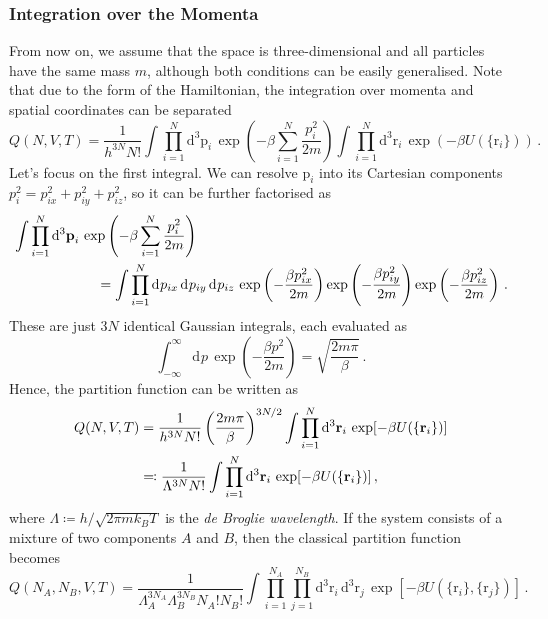 \documentclass{article}
\theoremstyle{plain}\theoremheaderfont{\normalfont\bfseries}\theorembodyfont{\rmfamily}\theoremseparator{.}\newtheorem*{thm}{Theorem}\newtheorem*{law}{Law}\newtheorem*{pos}{Postulate}
\numberwithin{equation}{section}
\newcommand{\dd}[2][]{\mathrm{d}^{#1} #2\,}
\newcommand{\vb}[1]{\bm{\mathrm{#1}}}
\begin{document}
    \subsubsection{Integration over the Momenta}
    From now on, we assume that the space is three-dimensional and all particles have the same mass \(m\), although both conditions can be easily generalised. Note that due to the form of the Hamiltonian, the integration over momenta and spatial coordinates can be separated
    \begin{equation}
        Q(N,V,T)=\frac{1}{h^{3N}N!}\int\prod_{i=1}^{N}\dd[3]{\vb{p}_i}\exp\left(-\beta\sum_{i=1}^{N}\frac{p_i^2}{2m}\right)\int\prod_{i=1}^{N}\dd[3]{\vb{r}_i}\exp(-\beta U(\{\vb{r}_i\}))\,.
    \end{equation}
    Let's focus on the first integral. We can resolve \(\vb{p}_i\) into its Cartesian components \(p_i^2=p_{ix}^2+p_{iy}^2+p_{iz}^2\), so it can be further factorised as
    \begin{align}
        &\int\prod_{i=1}^{N}\dd[3]{\vb{p}_i}\exp\left(-\beta\sum_{i=1}^{N}\frac{p_i^2}{2m}\right)\notag\\
        &\qquad\qquad\qquad= \int\prod_{i=1}^{N}\dd{p_{ix}}\dd{p_{iy}}\dd{p_{iz}}\exp\left(-\frac{\beta p_{ix}^2}{2m}\right)\exp\left(-\frac{\beta p_{iy}^2}{2m}\right)\exp\left(-\frac{\beta p_{iz}^2}{2m}\right)\,.
    \end{align}
    These are just \(3N\) identical Gaussian integrals, each evaluated as
    \begin{equation}
        \int_{-\infty}^{\infty}\dd{p}\exp\left(-\frac{\beta p^2}{2m}\right)=\sqrt{\frac{2m\pi}{\beta}}\,.
    \end{equation}
    Hence, the partition function can be written as
    \begin{align}
        Q(N,V,T)&=\frac{1}{h^{3N}N!}\left(\frac{2m\pi}{\beta}\right)^{3N/2}\int\prod_{i=1}^{N}\dd[3]{\vb{r}_i}\exp[-\beta U(\{\vb{r}_i\})] \notag\\
        &\eqqcolon\frac{1}{\Lambda^{3N}N!}\int\prod_{i=1}^N\dd[3]{\vb{r}_i}\exp[-\beta U(\{\vb{r}_i\})]\,,
    \end{align}
    where \(\Lambda\coloneqq h/\sqrt{2\pi mk_BT}\) is the \textit{de Broglie wavelength}. If the system consists of a mixture of two components \(A\) and \(B\), then the classical partition function becomes
    \begin{equation}
        Q(N_A,N_B,V,T)=\frac{1}{\Lambda_A^{3N_A}\Lambda_B^{3N_B}N_A!N_B!}\int\prod_{i=1}^{N_A}\prod_{j=1}^{N_B}\dd[3]{\vb{r}_i}\dd[3]{\vb{r}_j}\exp[-\beta U(\{\vb{r}_i\},\{\vb{r}_j\})]\,.
    \end{equation}
\end{document}
